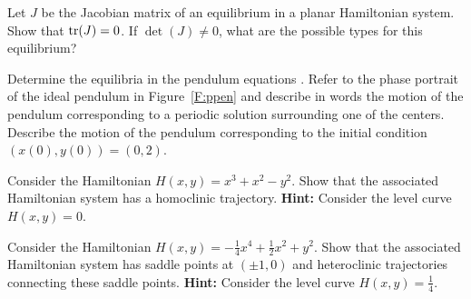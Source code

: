 \documentclass{ximera}
\begin{document}
\begin{exercise} \label{c14.7.8}
Let $J$ be the Jacobian matrix of an equilibrium in a planar Hamiltonian 
system. Show that ${\rm tr}(J)=0$.  If $\det(J)\neq 0$, what are the possible
types for this equilibrium?
\end{exercise}

\begin{exercise} \label{c14.7.9}
Determine the equilibria in the pendulum equations .
Refer to the phase portrait of the ideal pendulum in Figure~\ref{F:ppen}
and describe in words the motion of the pendulum corresponding to a periodic 
solution surrounding one of the centers.  Describe the motion of the 
pendulum corresponding to the initial condition $(x(0),y(0))=(0,2)$.
\end{exercise}

\begin{exercise} \label{c14.7.10}
Consider the Hamiltonian  $H(x,y) = x^3 + x^2 - y^2$.  Show that the 
associated Hamiltonian system has a homoclinic trajectory.  {\bf Hint:} 
Consider the level curve $H(x,y)=0$.
\end{exercise}

\begin{exercise} \label{c14.7.11} 
Consider the Hamiltonian  $H(x,y) = -\frac{1}{4}x^4 + \frac{1}{2}x^2 + y^2$.  
Show that the associated Hamiltonian system has saddle points at $(\pm 1,0)$ 
and heteroclinic trajectories connecting these saddle points.  {\bf Hint:} 
Consider the level curve $H(x,y) = \frac{1}{4}$.
\end{exercise}






 
\end{document}
